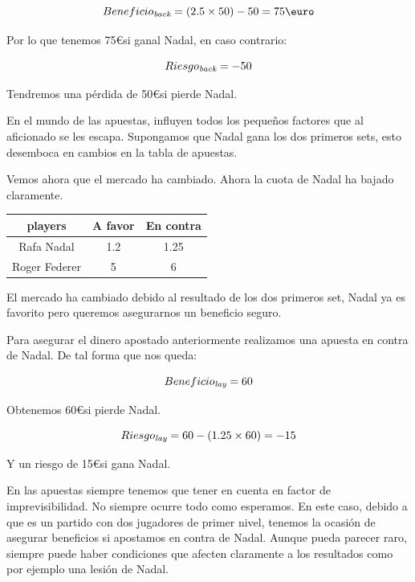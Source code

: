   
\begin{displaymath}
  Beneficio_\emph{back} = (2.5 \times 50) - 50 =  75\euro  
\end{displaymath}

Por lo que tenemos 75\euro si ganal Nadal, en caso contrario:
 
 \begin{displaymath}
  Riesgo_\emph{back} = - 50 
\end{displaymath}

Tendremos una pérdida de 50\euro si pierde Nadal.

En el mundo de las apuestas, influyen todos los pequeños factores que al aficionado se les escapa. Supongamos que Nadal gana los dos primeros sets, esto desemboca en cambios en la tabla de apuestas. 

Vemos ahora que el mercado ha cambiado. Ahora la cuota de Nadal ha bajado claramente.
   
 \begin{center}
    \begin{tabular}{| c | c | c |}
      \hline
      \hline
      players & A favor & En contra\\
      \hline
      \hline
      Rafa Nadal & 1.2 & 1.25\\
      \hline
      \hline
      Roger Federer & 5 & 6\\
      \hline
      \hline
    \end{tabular}
  \end{center}
  
  
  El mercado ha cambiado debido al resultado de los dos primeros set, Nadal ya es favorito pero queremos asegurarnos un beneficio seguro.
  
Para asegurar el dinero apostado anteriormente realizamos una apuesta en contra de Nadal. De tal forma que nos queda:

  \begin{displaymath}
  Beneficio_\emph{lay} = 60 
  \end{displaymath} 
  
   Obtenemos 60\euro si pierde Nadal.
   
   \begin{displaymath}
  Riesgo_\emph{lay} = 60 - (1.25 \times 60) = -15
  \end{displaymath} 
  
  Y un riesgo de 15\euro si gana Nadal.
  
En las apuestas siempre tenemos que tener en cuenta en factor de imprevisibilidad. No siempre ocurre todo como esperamos. En este caso, debido a que es un partido con dos jugadores de primer nivel, tenemos la ocasión de asegurar beneficios si apostamos en contra de Nadal. Aunque pueda parecer raro, siempre puede haber condiciones que afecten claramente a los resultados como por ejemplo una lesión de Nadal.
	 
